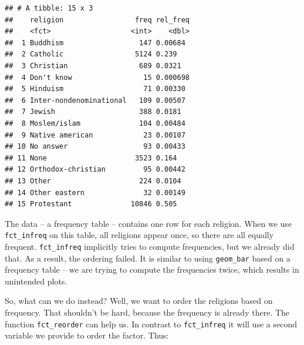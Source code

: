 \documentclass[]{tufte-book}
\newenvironment{Shaded}{}{}
\newcommand{\DataTypeTok}[1]{\textcolor[rgb]{0.56,0.13,0.00}{#1}}
\newcommand{\KeywordTok}[1]{\textcolor[rgb]{0.00,0.44,0.13}{\textbf{#1}}}
\newcommand{\NormalTok}[1]{#1}
\newcommand{\OperatorTok}[1]{\textcolor[rgb]{0.40,0.40,0.40}{#1}}
\newcommand{\StringTok}[1]{\textcolor[rgb]{0.25,0.44,0.63}{#1}}
\begin{document}
\begin{verbatim}
## # A tibble: 15 x 3
##    religion                 freq rel_freq
##    <fct>                   <int>    <dbl>
##  1 Buddhism                  147 0.00684 
##  2 Catholic                 5124 0.239   
##  3 Christian                 689 0.0321  
##  4 Don't know                 15 0.000698
##  5 Hinduism                   71 0.00330 
##  6 Inter-nondenominational   109 0.00507 
##  7 Jewish                    388 0.0181  
##  8 Moslem/islam              104 0.00484 
##  9 Native american            23 0.00107 
## 10 No answer                  93 0.00433 
## 11 None                     3523 0.164   
## 12 Orthodox-christian         95 0.00442 
## 13 Other                     224 0.0104  
## 14 Other eastern              32 0.00149 
## 15 Protestant              10846 0.505
\end{verbatim}

The data -- a frequency table -- contains one row for each religion. When we use \texttt{fct\_infreq} on this table, all religions appear once, so there are all equally frequent. \texttt{fct\_infreq} implicitly tries to compute frequencies, but we already did that. As a result, the ordering failed. It is similar to using \texttt{geom\_bar} based on a frequency table -- we are trying to compute the frequencies twice, which results in unintended plots.

So, what can we do instead? Well, we want to order the religions based on frequency. That shouldn't be hard, because the frequency is already there. The function \texttt{fct\_reorder} can help us. In contrast to \texttt{fct\_infreq} it will use a second variable we provide to order the factor. Thus:

\begin{Shaded}
\end{Shaded}
\end{document}
